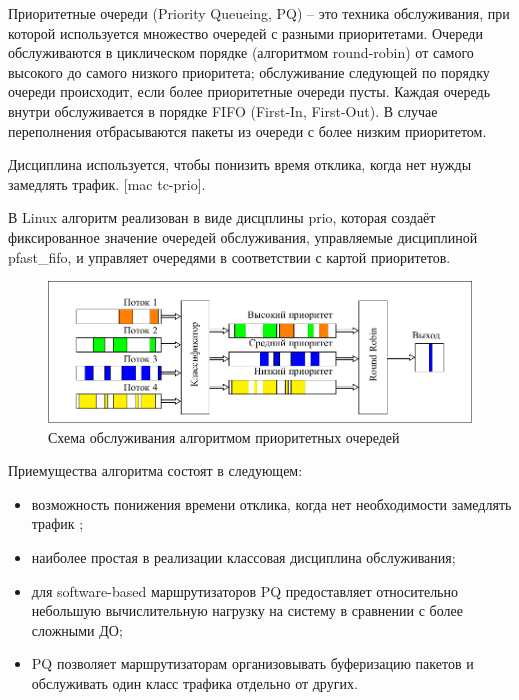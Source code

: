     Приоритетные очереди (Priority Queueing, PQ) -- это техника обслуживания,
    при которой используется множество очередей с разными приоритетами. Очереди
    обслуживаются в циклическом порядке (алгоритмом round-robin) от самого высокого 
    до самого низкого приоритета; обслуживание следующей по порядку очереди происходит,
    если более приоритетные очереди пусты. Каждая очередь внутри обслуживается в порядке FIFO
    (First-In, First-Out). В случае переполнения отбрасываются пакеты из очереди
    с более низким приоритетом.\cite{packethandling}
    
    Дисциплина используется, чтобы понизить время отклика, когда нет нужды замедлять трафик. [mac tc-prio].

    В Linux алгоритм реализован в виде дисцплины prio, которая создаёт фиксированное
    значение очередей обслуживания, управляемые дисциплиной pfast\_fifo, и управляет
    очередями в соответствии с картой приоритетов.\cite{tcprio}

    \begin{figure}[ht!]
        \center
        \includegraphics{pdfimages/pq.pdf}
        \caption{Схема обслуживания алгоритмом приоритетных очередей}
    \end{figure}

    Приемущества алгоритма состоят в следующем:
    \begin{itemize}
		\item возможность понижения времени отклика, когда нет необходимости замедлять трафик \cite{tcprio};
        \item наиболее простая в реализации классовая дисциплина обслуживания;
        \item для software-based маршрутизаторов PQ предоставляет относительно небольшую
             вычислительную нагрузку на систему в сравнении с более сложными ДО;
        \item PQ позволяет маршрутизаторам организовывать буферизацию пакетов и обслуживать
             один класс трафика отдельно от других. \cite{suppdiff}
    \end{itemize}

